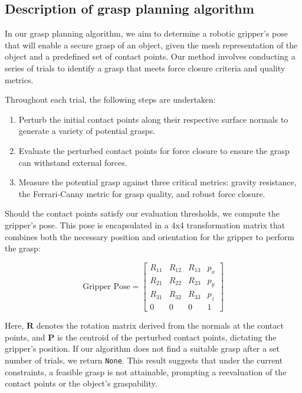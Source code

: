 \documentclass{article}
\begin{document}
\begin{multicols}{2}
\subsection{Description of grasp planning algorithm}

In our grasp planning algorithm, we aim to determine a robotic gripper's pose that will enable a secure grasp of an object, given the mesh representation of the object and a predefined set of contact points. Our method involves conducting a series of trials to identify a grasp that meets force closure criteria and quality metrics.

Throughout each trial, the following steps are undertaken:

\begin{enumerate}
\item Perturb the initial contact points along their respective surface normals to generate a variety of potential grasps.
\item Evaluate the perturbed contact points for force closure to ensure the grasp can withstand external forces.
\item Measure the potential grasp against three critical metrics: gravity resistance, the Ferrari-Canny metric for grasp quality, and robust force closure.
\end{enumerate}

Should the contact points satisfy our evaluation thresholds, we compute the gripper's pose. This pose is encapsulated in a 4x4 transformation matrix that combines both the necessary position and orientation for the gripper to perform the grasp:

\begin{equation}
\text{Gripper Pose} = \begin{bmatrix}
R_{11} & R_{12} & R_{13} & p_x \\
R_{21} & R_{22} & R_{23} & p_y \\
R_{31} & R_{32} & R_{33} & p_z \\
0 & 0 & 0 & 1
\end{bmatrix}
\end{equation}

Here, 
$\mathbf{R}$ denotes the rotation matrix derived from the normals at the contact points, and $\mathbf{P}$
  is the centroid of the perturbed contact points, dictating the gripper's position. If our algorithm does not find a suitable grasp after a set number of trials, we return \texttt{None}. This result suggests that under the current constraints, a feasible grasp is not attainable, prompting a reevaluation of the contact points or the object's graspability.






\end{multicols}
\end{document}

